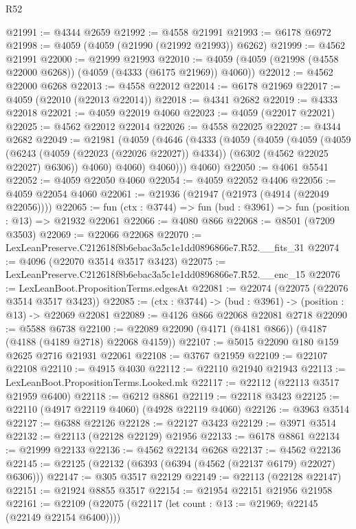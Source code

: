 \begin{lexlean}{R52}
\begin{coremodule}
@21991 := @4344 @2659
@21992 := @4558 @21991
@21993 := @6178 @6972
@21998 := @4059 (@4059 (@21990 (@21992 @21993)) @6262)
@21999 := @4562 @21991
@22000 := @21999 @21993
@22010 := @4059 (@4059 (@21998 (@4558 @22000 @6268)) (@4059 (@4333 (@6175 @21969)) @4060))
@22012 := @4562 @22000 @6268
@22013 := @4558 @22012
@22014 := @6178 @21969
@22017 := @4059 (@22010 (@22013 @22014))
@22018 := @4341 @2682
@22019 := @4333 @22018
@22021 := @4059 @22019 @4060
@22023 := @4059 (@22017 @22021)
@22025 := @4562 @22012 @22014
@22026 := @4558 @22025
@22027 := @4344 @2682
@22049 := @21981
    (@4059
      (@4646
        (@4333
          (@4059
            (@4059
              (@4059
                (@4059
                  (@6243 (@4059 (@22023 (@22026 @22027)) @4334))
                  (@6302 (@4562 @22025 @22027) @6306))
                @4060)
              @4060)
            @4060)))
      @4060)
@22050 := @4061 @5541
@22052 := @4059 @22050 @4060
@22054 := @4059 @22052 @4406
@22056 := @4059 @22054 @4060
@22061 := @21936 (@21947 (@21973 (@4914 (@22049 @22056))))
@22065 := fun (ctx : @3744) => fun (bud : @3961) => fun (position : @13) => @21932 @22061
@22066 := @4080 @866
@22068 := @8501 (@7209 @3503)
@22069 := @22066 @22068
@22070 := LexLeanPreserve.C212618f8b6ebac3a5c1e1dd0896866e7.R52.__fits_31
@22074 := @4096 (@22070 @3514 @3517 @3423)
@22075 := LexLeanPreserve.C212618f8b6ebac3a5c1e1dd0896866e7.R52.__enc_15
@22076 := LexLeanBoot.PropositionTerms.edgesAt
@22081 := @22074 (@22075 (@22076 @3514 @3517 @3423))
@22085 := (ctx : @3744) -> (bud : @3961) -> (position : @13) -> @22069 @22081
@22089 := @4126 @866 @22068 @22081 @2718
@22090 := @5588 @6738
@22100 := @22089 @22090 (@4171 (@4181 @866)) (@4187 (@4188 (@4189 @2718) @22068 @4159))
@22107 := @5015 @22090 @180 @159 @2625 @2716 @21931 @22061
@22108 := @3767 @21959
@22109 := @22107 @22108
@22110 := @4915 @4030
@22112 := @22110 @21940 @21943
@22113 := LexLeanBoot.PropositionTerms.Looked.mk
@22117 := @22112 (@22113 @3517 @21959 @6400)
@22118 := @6212 @8861
@22119 := @22118 @3423
@22125 := @22110 (@4917 @22119 @4060) (@4928 @22119 @4060)
@22126 := @3963 @3514
@22127 := @6388 @22126
@22128 := @22127 @3423
@22129 := @3971 @3514
@22132 := @22113 (@22128 @22129) @21956
@22133 := @6178 @8861
@22134 := @21999 @22133
@22136 := @4562 @22134 @6268
@22137 := @4562 @22136
@22145 := @22125 (@22132 (@6393 (@6394 (@4562 (@22137 @6179) @22027) @6306)))
@22147 := @305 @3517 @22129
@22149 := @22113 (@22128 @22147)
@22151 := @21924 @8855 @3517
@22154 := @21954 @22151 @21956 @21958
@22161 := @22109 (@22075 (@22117 (let count : @13 := @21969; @22145 (@22149 @22154 @6400))))

\end{coremodule}
\end{lexlean}
